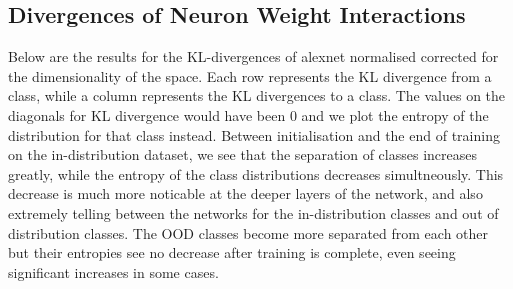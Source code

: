 \documentclass{article}
\begin{document}
        \subsection{Divergences of Neuron Weight Interactions}
            Below are the results for the KL-divergences of alexnet normalised corrected for the dimensionality of the space. Each row represents the KL divergence from a class, while a column represents the KL divergences to a class. The values on the diagonals for KL divergence would have been 0 and we plot the entropy of the distribution for that class instead.  Between initialisation and the end of training on the in-distribution dataset, we see that the separation of classes increases greatly, while the entropy of the class distributions decreases simultneously. This decrease is much more noticable at the deeper layers of the network, and also extremely telling between the networks for the in-distribution classes and out of distribution classes. The OOD classes become more separated from each other but their entropies see no decrease after training is complete, even seeing significant increases in some cases. 
\end{document}
